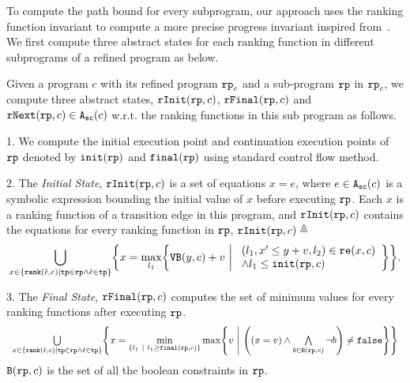 To compute the path bound for every subprogram, our approach uses the ranking function invariant to compute a more precise progress invariant inspired from~\cite{GulwaniJK09}.
We first compute three abstract states for each ranking function in different subprograms of a refined program as below.
\begin{defn}
 \label{def:alg-absstate}
 Given a program $c$ with its refined program $\mathtt{rp}_c$ and a sub-program $\mathtt{rp}$ in $\mathtt{rp}_c$,
 we compute three abstract states, $\mathtt{rInit}(\mathtt{rp}, c)$, $\mathtt{rFinal}(\mathtt{rp}, c)$ and $\mathtt{rNext}(\mathtt{rp}, c) \in {\ensuremath{\mathtt{A_{sc}}}}(c)$ w.r.t. the ranking functions in this sub program as follows.
 
 1. We compute the initial execution point and continuation execution points of $\mathtt{rp}$ denoted by
 $\mathtt{init}(\mathtt{rp})$
 and 
 $\mathtt{final}(\mathtt{rp})$ using standard control flow method.
 
2. The \emph{Initial State}, 
 $\mathtt{rInit}(\mathtt{rp}, c)$ is a set of equations $x = e$, where $e \in {\ensuremath{\mathtt{A_{sc}}}}(c)$ is a
 symbolic expression bounding the initial value of $x$ before executing $\mathtt{rp}$.
 Each $x$ is a ranking function of a transition edge in this program, and $\mathtt{rInit}(\mathtt{rp}, c)$ contains the equations for every ranking function in $\mathtt{rp}$,
 $\mathtt{rInit}(\mathtt{rp}, c) \triangleq $
 {\small
 \[
 \bigcup_{x \in \left\{ \rank(\absevent, c) | \tpath \in \rprog \land \absevent \in \tpath \right\} }
 \left \{ 
 x = \max_{l_1}\left\{
 \varinvar(y, c) + v ~\middle\vert~ 
 \begin{array}{l} 
 (l_1, x' \leq y + v, l_2) \in \reset(x, c) 
 \\
 \land l_1 \leq \absinit(\rprog, c)
 \end{array}
 \right\}
 \right\}.
 \]
 }

 3. The \emph{Final State}, $\mathtt{rFinal}(\mathtt{rp}, c)$ computes the set of minimum values for every ranking functions
 after executing $\mathtt{rp}$.
 {\small
\[
 \begin{array}{l} 
 \bigcup\limits_{x \in \left\{ \rank(\absevent, c) | \tpath \in \rprog \land \absevent \in \tpath \right\} }
 \left \{ 
 x = \min\limits_{ \left\{ l_1 ~|~ l_1 \geq \absfinal(\rprog, c) \right\} }
 \max\left\{
 v ~\middle\vert~ 
 \left( (x = v) \land \bigwedge\limits_{b \in \kw{B}(\rprog, c)} \neg b \right) \neq \efalse
 \right\}
 \right\}
 \end{array}
 \]
 }
 $\mathtt{B}(\mathtt{rp}, c)$ is the set of all the boolean constraints in $\mathtt{rp}$.


\end{defn}
